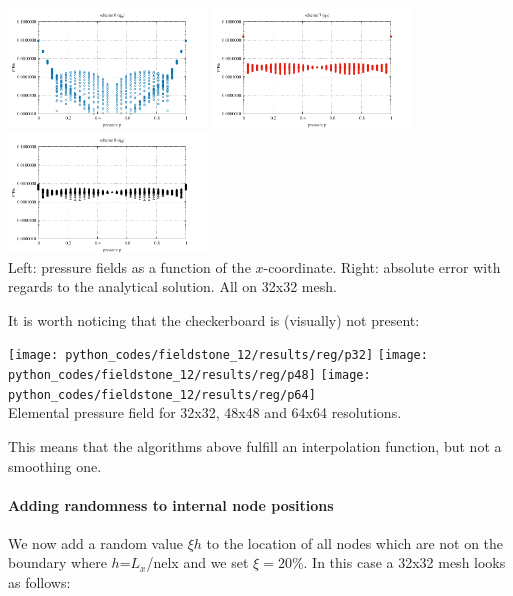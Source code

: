 \begin{center}
\includegraphics[width=5.3cm]{python_codes/fieldstone_12/results/reg/q6_error}
\includegraphics[width=5.3cm]{python_codes/fieldstone_12/results/reg/q7_error}
\includegraphics[width=5.3cm]{python_codes/fieldstone_12/results/reg/q8_error}\\
{\captionfont Left: pressure fields as a function of the $x$-coordinate. 
Right: absolute error with regards to the analytical solution. All on 32x32 mesh.}
\end{center}

It is worth noticing that the checkerboard is (visually) not present:
\begin{center}
\texttt{[image: python\_codes/fieldstone\_12/results/reg/p32]}
\texttt{[image: python\_codes/fieldstone\_12/results/reg/p48]}
\texttt{[image: python\_codes/fieldstone\_12/results/reg/p64]}\\
{\captionfont Elemental pressure field for 32x32, 48x48 and 64x64 resolutions.}
\end{center}
This means that the algorithms above fulfill an interpolation function, but not a smoothing one.

\newpage
\paragraph{Adding randomness to internal node positions} We now add a random value $\xi h$ to the 
location of all nodes which are not on the boundary where $h$=$L_x$/nelx and we set $\xi=20\%$.
In this case a 32x32 mesh looks as follows:

